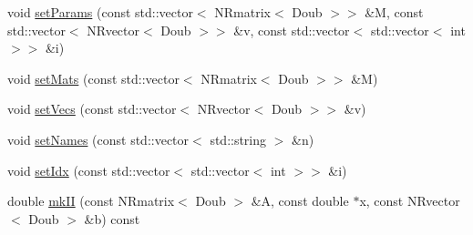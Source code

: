 \begin{DoxyCompactItemize}
void \hyperlink{struct_p_r_p_s_evolution_1_1_whole_tomato_mk_i_i_a5481c6c4a5ec37cf35604073f1ced74b}{set\-Params} (const std\-::vector$<$ \-N\-Rmatrix$<$ \-Doub $>$$>$ \&\-M, const std\-::vector$<$ \-N\-Rvector$<$ \-Doub $>$$>$ \&v, const std\-::vector$<$ std\-::vector$<$ int $>$$>$ \&i)
\item 
void \hyperlink{struct_p_r_p_s_evolution_1_1_whole_tomato_mk_i_i_adf5e0df6fb532b7d864c4d6b2a5ee3eb}{set\-Mats} (const std\-::vector$<$ \-N\-Rmatrix$<$ \-Doub $>$$>$ \&\-M)
\item 
void \hyperlink{struct_p_r_p_s_evolution_1_1_whole_tomato_mk_i_i_a8bf1b081c39c58754b0fcde1bacec281}{set\-Vecs} (const std\-::vector$<$ \-N\-Rvector$<$ \-Doub $>$$>$ \&v)
\item 
void \hyperlink{struct_p_r_p_s_evolution_1_1_whole_tomato_mk_i_i_a29b7f20a3771fdadb87a75be9bc3f365}{set\-Names} (const std\-::vector$<$ std\-::string $>$ \&n)
\item 
void \hyperlink{struct_p_r_p_s_evolution_1_1_whole_tomato_mk_i_i_a45776eba8a169cac622b289a91977f6a}{set\-Idx} (const std\-::vector$<$ std\-::vector$<$ int $>$$>$ \&i)
\item 
double \hyperlink{struct_p_r_p_s_evolution_1_1_whole_tomato_mk_i_i_a2751190605f210016de756d5bc2cee28}{mk\-I\-I} (const \-N\-Rmatrix$<$ \-Doub $>$ \&\-A, const double $\ast$x, const \-N\-Rvector$<$ \-Doub $>$ \&b) const 
\end{DoxyCompactItemize}


